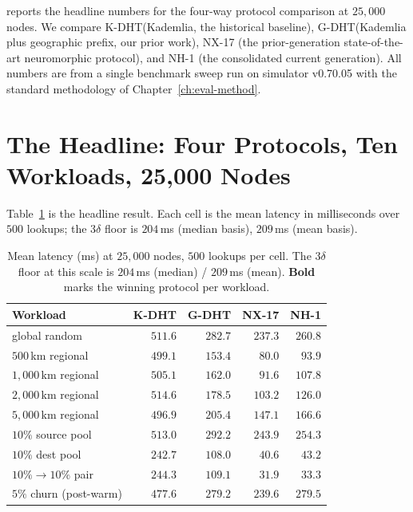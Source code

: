 \documentclass[twoside,nobib]{tufte-book}
\newcommand{\KDHT}{K-DHT\xspace}
\newcommand{\GDHT}{G-DHT\xspace}
\begin{document}
 reports the headline numbers for the
four-way protocol comparison at $25{,}000$ nodes. We compare
\KDHT (Kademlia, the historical baseline), \GDHT (Kademlia plus
geographic prefix, our prior work), NX-17 (the prior-generation
state-of-the-art neuromorphic protocol), and NH-1 (the
consolidated current generation). All numbers are from a
single benchmark sweep run on simulator v0.70.05 with the
standard methodology of Chapter~\ref{ch:eval-method}.

\section{The Headline: Four Protocols, Ten Workloads, 25,000 Nodes}

Table~\ref{tab:perf-headline} is the headline result. Each cell
is the mean latency in milliseconds over $500$ lookups; the
3$\delta$ floor is $204$\,ms (median basis), $209$\,ms (mean basis).

\begin{table}[h]
\centering
\small
\caption{Mean latency (ms) at $25{,}000$ nodes, $500$ lookups per
cell. The 3$\delta$ floor at this scale is $204$\,ms (median) /
$209$\,ms (mean). \textbf{Bold} marks the winning protocol per
workload.}
\label{tab:perf-headline}
\begin{tabular}{@{}lrrrr@{}}
\toprule
\textbf{Workload} & \textbf{\KDHT} & \textbf{\GDHT} &
\textbf{NX-17} & \textbf{NH-1} \\
\midrule
global random           & $511.6$ & $282.7$ & $\mathbf{237.3}$ & $260.8$ \\
$500$\,km regional      & $499.1$ & $153.4$ & $\mathbf{80.0}$  & $93.9$ \\
$1{,}000$\,km regional  & $505.1$ & $162.0$ & $\mathbf{91.6}$  & $107.8$ \\
$2{,}000$\,km regional  & $514.6$ & $178.5$ & $\mathbf{103.2}$ & $126.0$ \\
$5{,}000$\,km regional  & $496.9$ & $205.4$ & $\mathbf{147.1}$ & $166.6$ \\
$10\%$ source pool      & $513.0$ & $292.2$ & $\mathbf{243.9}$ & $254.3$ \\
$10\%$ dest pool        & $242.7$ & $108.0$ & $\mathbf{40.6}$  & $43.2$ \\
$10\% \to 10\%$ pair    & $244.3$ & $109.1$ & $\mathbf{31.9}$  & $33.3$ \\
$5\%$ churn (post-warm) & $477.6$ & $279.2$ & $\mathbf{239.6}$ & $279.5$ \\
\bottomrule
\end{tabular}
\end{table}
\end{document}
